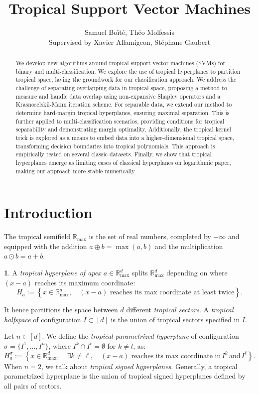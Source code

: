\documentclass[oneside,english]{amsart}
\numberwithin{equation}{section}
\numberwithin{figure}{section}
\theoremstyle{plain}
\theoremstyle{definition}
\newtheorem{defn}[thm]{\protect\definitionname}
\theoremstyle{plain}
\theoremstyle{remark}
\theoremstyle{plain}
\theoremstyle{definition}
\theoremstyle{definition}
\providecommand{\definitionname}{Definition}
\begin{document}
\title{Tropical Support Vector Machines}
\author{Samuel Boïté, Théo Molfessis \\ Supervised by Xavier Allamigeon, Stéphane Gaubert}
\maketitle

\begin{abstract}
    We develop new algorithms around tropical support vector machines (SVMs) for binary and multi-classification. We explore the use of tropical hyperplanes to partition tropical space, laying the groundwork for our classification approach. We address the challenge of separating overlapping data in tropical space, proposing a method to measure and handle data overlap using non-expansive Shapley operators and a Krasnoselskii-Mann iteration scheme. For separable data, we extend our method to determine hard-margin tropical hyperplanes, ensuring maximal separation. This is further applied to multi-classification scenarios, providing conditions for tropical separability and demonstrating margin optimality. Additionally, the tropical kernel trick is explored as a means to embed data into a higher-dimensional tropical space, transforming decision boundaries into tropical polynomials. This approach is empirically tested on several classic datasets. Finally, we show that tropical hyperplanes emerge as limiting cases of classical hyperplanes on logarithmic paper, making our approach more stable numerically.
\end{abstract}

\section{Introduction}


The tropical semifield $\mathbb{R}_{\max}$ is the set of real numbers,
completed by $-\infty$ and equipped with the addition $a\oplus b=\max(a,b)$
and the multiplication $a\odot b=a+b$.
\begin{defn}
A \emph{tropical hyperplane of apex $a\in\mathbb{R}_{\text{max}}^{d}$
}splits $\mathbb{R}_{\max}^{d}$ depending on where $(x-a)$ reaches
its maximum coordinate: 
\[
H_{a}:=\left\{ x\in\mathbb{R}_{\max}^{d},\quad(x-a)\,\,\text{reaches its max coordinate at least twice}\right\} .
\]

It hence partitions the space between $d$ different \emph{tropical
sectors}. A \emph{tropical halfspace} of configuration $I\subset[d]$
is the union of tropical sectors specified in $I$.

Let $n\in[d]$. We define the \emph{tropical parametrized hyperplane} of configuration
$\sigma=\{I^{1},\ldots,I^{n}\}$, where $I^k \cap I^\ell = \emptyset$ for $k\ne l$, as:
\[
H_{a}^{\sigma}:=\left\{ x\in\mathbb{R}_{\max}^{d},\quad\exists k\ne\ell,\quad(x-a)\,\,\text{reaches its max coordinate in}\,I^{k}\,\text{and}\,I^{\ell}\right\} .
\]
When $n=2$, we talk about \emph{tropical signed hyperplanes}. Generally,
a tropical parametrized hyperplane is the union of tropical signed
hyperplanes defined by all pairs of sectors.
\end{defn}
\end{document}
